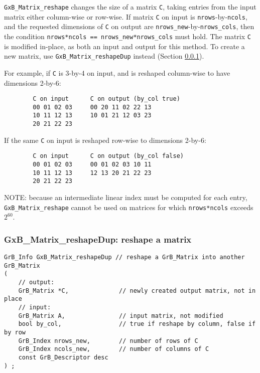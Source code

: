\documentclass[12pt]{article}
\begin{document}
\verb'GxB_Matrix_reshape' changes the size of a matrix \verb'C', taking entries
from the input matrix either column-wise or row-wise.  If matrix \verb'C' on
input is \verb'nrows'-by-\verb'ncols', and the requested dimensions of
\verb'C' on output are \verb'nrows_new'-by-\verb'nrows_cols', then
the condition \verb'nrows*ncols == nrows_new*nrows_cols' must hold.
The matrix \verb'C' is modified in-place, as both an input and output for
this method.  To create a new matrix, use \verb'GxB_Matrix_reshapeDup'
instead (Section \ref{matrix_reshapedup}).

For example, if \verb'C' is 3-by-4 on input, and is reshaped column-wise to
have dimensions 2-by-6:

\begin{verbatim}
        C on input      C on output (by_col true)
        00 01 02 03     00 20 11 02 22 13
        10 11 12 13     10 01 21 12 03 23
        20 21 22 23
\end{verbatim}

If the same \verb'C' on input is reshaped row-wise to dimensions 2-by-6:

\begin{verbatim}
        C on input      C on output (by_col false)
        00 01 02 03     00 01 02 03 10 11
        10 11 12 13     12 13 20 21 22 23
        20 21 22 23
\end{verbatim}

NOTE: because an intermediate linear index must be computed for each entry,
\verb'GxB_Matrix_reshape' cannot be used on matrices for which
\verb'nrows*ncols' exceeds $2^{60}$.

\newpage
\subsubsection{{\sf GxB\_Matrix\_reshapeDup:} reshape a matrix}
\label{matrix_reshapedup}

\begin{mdframed}[userdefinedwidth=6in]
{\footnotesize
\begin{verbatim}
GrB_Info GxB_Matrix_reshapeDup // reshape a GrB_Matrix into another GrB_Matrix
(
    // output:
    GrB_Matrix *C,              // newly created output matrix, not in place
    // input:
    GrB_Matrix A,               // input matrix, not modified
    bool by_col,                // true if reshape by column, false if by row
    GrB_Index nrows_new,        // number of rows of C
    GrB_Index ncols_new,        // number of columns of C
    const GrB_Descriptor desc
) ;
\end{verbatim} } \end{mdframed}
\end{document}

